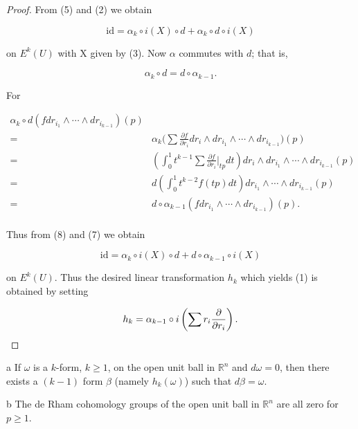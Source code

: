 \begin{proof}
From (5) and (2) we obtain

\begin{equation}
\tag{7}\label{eq:4.18:7}
\mathrm{id}=\alpha_{k}\circ i(X)\circ d+\alpha_{k}\circ d\circ i(X)
\end{equation}

on  $ E^{k}(U) $ with X given by (3). Now  $ \alpha $ commutes with  $ d $; that is,

\[
\alpha_{k}\circ d=d\circ\alpha_{k-1}.
\]

For

\[
\begin{aligned}{\alpha_{k}\circ d(f dr_{i_{1}}\wedge\cdots\wedge dr_{i_{k-1}})(p)}\\ {=}&{{}\alpha_{k}\bigg(\sum\frac{\partial f}{\partial r_{i}}d r_{i}\wedge dr_{i_{1}}\wedge\cdots\wedge dr_{i_{k-1}}\bigg)(p)}\\ {=}&{{}\left(\int_{0}^{1}t^{k-1}\sum\frac{\partial f}{\partial r_{i}}\bigg|_{t p}d t\right)d r_{i}\wedge dr_{i_{1}}\wedge\cdots\wedge dr_{i_{k-1}}(p)}\\ {=}&{{}d\left(\int_{0}^{1}t^{k-2}f(t p)d t\right)dr_{i_{1}}\wedge\cdots\wedge dr_{i_{k-1}}(p)}\\ {=}&{{}d\circ\alpha_{k-1}(f dr_{i_{1}}\wedge\cdots\wedge dr_{i_{k-1}})(p).}\\ \end{aligned}
\]

Thus from (8) and (7) we obtain


\[
\mathrm{id}=\alpha_{k}\circ i(X)\circ d+d\circ\alpha_{k-1}\circ i(X)
\]

on  $ E^{k}(U) $. Thus the desired linear transformation  $ h_{k} $ which yields (1) is obtained by setting

\[
h_{k}=\alpha_{k-1}\circ i\left(\sum r_{i}\frac{\partial}{\partial r_{i}}\right).
\qedhere
\]
\end{proof}

\begin{corollary*}{a}
If $\omega$ is a $k$-form, $k \geq 1$, on the open unit ball in $\mathbb{R}^n$ and $d\omega = 0$, then there exists a $(k-1)$ form $\beta$ (namely $h_k(\omega)$) such that $d\beta = \omega$.

\end{corollary*}

\begin{corollary*}{b}
The de Rham cohomology groups of the open unit ball in  $ \mathbb{R}^n $ are all zero for  $ p \geq 1 $.
\end{corollary*}

